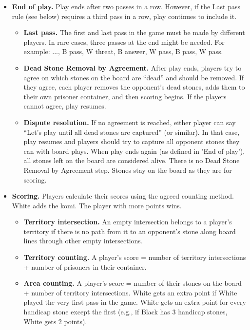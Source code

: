 \documentclass[11pt]{article}
\begin{document}
\begin{itemize}
\item \textbf{End of play.} Play ends after two passes in a row.
However, if the Last pass rule (see below) requires a third pass in a row, play continues to include it.
    \begin{itemize}
    \item \textbf{Last pass.} The first and last pass in the game must be made by different players.
    In rare cases, three passes at the end might be needed. For example: ..., B pass, W threat, B answer, W pass, B pass, W pass.
    \item \textbf{Dead Stone Removal by Agreement.} After play ends, players try to agree on which stones on the board are ``dead'' and should be removed.
    If they agree, each player removes the opponent's dead stones, adds them to their own prisoner container, and then scoring begins.
    If the players cannot agree, play resumes.
    \item \textbf{Dispute resolution.} If no agreement is reached, either player can say ``Let's play until all dead stones are captured'' (or similar).
    In that case, play resumes and players should try to capture all opponent stones they can with board plays.
    When play ends again (as defined in 'End of play'), all stones left on the board are considered alive.
    There is no Dead Stone Removal by Agreement step.
    Stones stay on the board as they are for scoring.
    \end{itemize}

\item \textbf{Scoring.} Players calculate their scores using the agreed counting method.
White adds the komi.
The player with more points wins.
    \begin{itemize}
    \item \textbf{Territory intersection.} An empty intersection belongs to a player's territory if there is no path from it to an opponent's stone along board lines through other empty intersections.
    \item \textbf{Territory counting.} A player's score = number of territory intersections + number of prisoners in their container.
    \item \textbf{Area counting.} A player's score = number of their stones on the board + number of territory intersections.
    White gets an extra point if White played the very first pass in the game.
    White gets an extra point for every handicap stone except the first (e.g., if Black has 3 handicap stones, White gets 2 points).
    \end{itemize}
\end{itemize}
\end{document}
